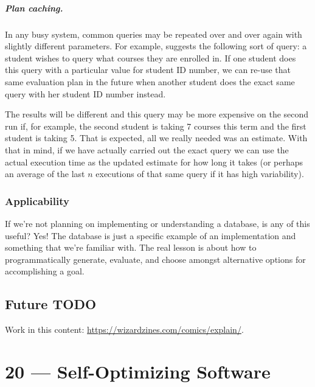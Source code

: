 \documentclass[a4paper]{report}
\begin{document}
\paragraph{Plan caching.} In any busy system, common queries may be repeated over and over again with slightly different parameters. For example, \cite{dsc} suggests the following sort of query: a student wishes to query what courses they are enrolled in. If one student does this query with a particular value for student ID number, we can re-use that same evaluation plan in the future when another student does the exact same query with her student ID number instead. 

The results will be different and this query may be more expensive on the second run if, for example, the second student is taking 7 courses this term and the first student is taking 5. That is expected, all we really needed was an estimate. With that in mind, if we have actually carried out the exact query we can use the actual execution time as the updated estimate for how long it takes (or perhaps an average of the last $n$ executions of that same query if it has high variability). 

\subsection*{Applicability}
If we're not planning on implementing or understanding a database, is any of this useful? Yes! The database is just a specific example of an implementation and something that we're familiar with. The real lesson is about how to programmatically generate, evaluate, and choose amongst alternative options for accomplishing a goal. 

\section*{Future TODO}
Work in this content: \url{https://wizardzines.com/comics/explain/}.









\chapter*{20 --- Self-Optimizing Software}

\end{document}
